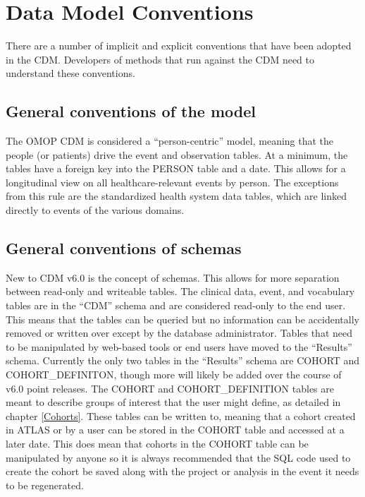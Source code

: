 \documentclass[11pt]{book}
\theoremstyle{definition}
\theoremstyle{definition}
\theoremstyle{definition}
\theoremstyle{remark}
\begin{document}
\hypertarget{data-model-conventions}{%
\section{Data Model Conventions}\label{data-model-conventions}}

There are a number of implicit and explicit conventions that have been adopted in the CDM. Developers of methods that run against the CDM need to understand these conventions.

\hypertarget{model-conv}{%
\subsection{General conventions of the model}\label{model-conv}}

The OMOP CDM is considered a ``person-centric'' model, meaning that the people (or patients) drive the event and observation tables. At a minimum, the tables have a foreign key into the PERSON table and a date. This allows for a longitudinal view on all healthcare-relevant events by person. The exceptions from this rule are the standardized health system data tables, which are linked directly to events of the various domains.

\hypertarget{general-conventions-of-schemas}{%
\subsection{General conventions of schemas}\label{general-conventions-of-schemas}}

New to CDM v6.0 is the concept of schemas. This allows for more separation between read-only and writeable tables. The clinical data, event, and vocabulary tables are in the ``CDM'' schema and are considered read-only to the end user. This means that the tables can be queried but no information can be accidentally removed or written over except by the database administrator. Tables that need to be manipulated by web-based tools or end users have moved to the ``Results'' schema. Currently the only two tables in the ``Results'' schema are COHORT and COHORT\_DEFINITON, though more will likely be added over the course of v6.0 point releases. The COHORT and COHORT\_DEFINITION tables are meant to describe groups of interest that the user might define, as detailed in chapter \ref{Cohorts}. These tables can be written to, meaning that a cohort created in ATLAS or by a user can be stored in the COHORT table and accessed at a later date. This does mean that cohorts in the COHORT table can be manipulated by anyone so it is always recommended that the SQL code used to create the cohort be saved along with the project or analysis in the event it needs to be regenerated.
\end{document}
